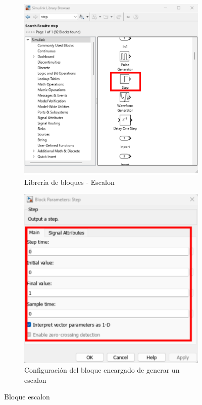 \begin{figure}[htbp]
    \centering
    \begin{subfigure}[b]{0.35\textwidth}
        \centering
        \includegraphics[width=\textwidth]{fig/Capitulo5/Caso_de_estudio_PID/lib_step.pdf}
        \caption{Librería de bloques - Escalon}
        \label{fig:step_lib}
    \end{subfigure}
    \hfill
    \begin{subfigure}[b]{0.45\textwidth}
        \centering
        \includegraphics[width=\textwidth]{fig/Capitulo5/Caso_de_estudio_PID/config_step.pdf}
        \caption{Configuración del bloque encargado de generar un escalon }
        \label{fig:step_conf}
    \end{subfigure}
    \caption{Bloque escalon}
    \label{fig:step_block}
\end{figure}
\newpage

